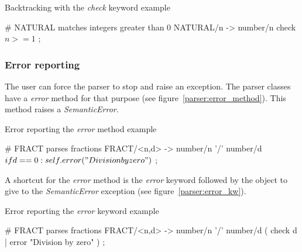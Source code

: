 \begin{code}
\caption{Backtracking with the \emph{check} keyword example}    \label{parser:checkkw}
\begin{verbatimtab}[4]
    # NATURAL matches integers greater than 0
    NATURAL/n ->
        number/n
        check $ n>=1 $
        ;
\end{verbatimtab}
\end{code}

\subsubsection{Error reporting}

The user can force the parser to stop and raise an exception.
The parser classes have a \emph{error} method for that purpose (see figure~\ref{parser:error_method}).
This method raises a \emph{SemanticError}.

\begin{code}
\caption{Error reporting the \emph{error} method example}   \label{parser:error_method}
\begin{verbatimtab}[4]
    # FRACT parses fractions
    FRACT/<n,d> ->
        number/n '/' number/d
        $ if d==0: self.error("Division by zero") $
        ;
\end{verbatimtab}
\end{code}

A shortcut for the \emph{error} method is the \emph{error} keyword followed by the object to give to the \emph{SemanticError} exception (see figure~\ref{parser:error_kw}).

\begin{code}
\caption{Error reporting the \emph{error} keyword example}  \label{parser:error_kw}
\begin{verbatimtab}[4]
    # FRACT parses fractions
    FRACT/<n,d> ->
        number/n '/' number/d
        ( check d | error "Division by zero" )
        ;
\end{verbatimtab}
\end{code}

